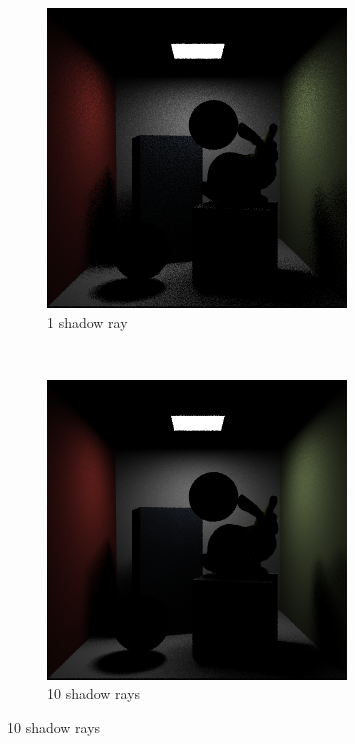 \documentclass[a4paper, 12pt]{report}
\begin{document}
\begin{figure}
        \centering
        \begin{subfigure}[h]{0.5\textwidth}
           \includegraphics[width=\textwidth]{figures/shadowrays-1-10rpp.png}
	\caption{1 shadow ray}
	\label{fig:1sr}
        \end{subfigure}%
        ~ %
        \begin{subfigure}[h]{0.5\textwidth}
                \includegraphics[width=\textwidth]{figures/shadowrays-10-10rpp.png}
                \caption{10 shadow rays}
                \label{fig:10sr}
        \end{subfigure}


\end{figure}
\end{document}
